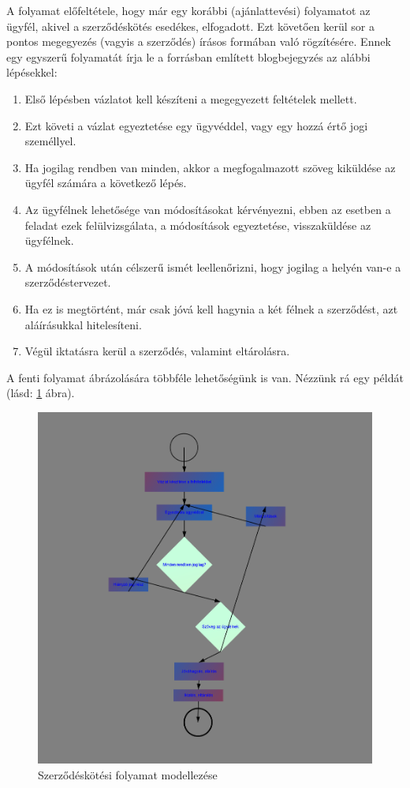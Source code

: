 A folyamat előfeltétele, hogy már egy korábbi (ajánlattevési) folyamatot az ügyfél, akivel a szerződéskötés esedékes, elfogadott. Ezt követően kerül sor a pontos megegyezés (vagyis a szerződés) írásos formában való rögzítésére. Ennek egy egyszerű folyamatát írja le a forrásban említett blogbejegyzés az alábbi lépésekkel:

\begin{enumerate}
\item Első lépésben vázlatot kell készíteni a megegyezett feltételek mellett.
\item Ezt követi a vázlat egyeztetése egy ügyvéddel, vagy egy hozzá értő jogi személlyel.
\item Ha jogilag rendben van minden, akkor a megfogalmazott szöveg kiküldése az ügyfél számára a következő lépés.
\item Az ügyfélnek lehetősége van módosításokat kérvényezni, ebben az esetben a feladat ezek felülvizsgálata, a módosítások egyeztetése, visszaküldése az ügyfélnek.
\item A módosítások után célszerű ismét leellenőrizni, hogy jogilag a helyén van-e a szerződéstervezet.
\item Ha ez is megtörtént, már csak jóvá kell hagynia a két félnek a szerződést, azt aláírásukkal hitelesíteni.
\item Végül iktatásra kerül a szerződés, valamint eltárolásra.
\end{enumerate}
A fenti folyamat ábrázolására többféle lehetőségünk is van. Nézzünk rá egy példát (lásd: \ref{fig:bpmn2} ábra).

\begin{figure}[h]
\centering
\includegraphics[scale=0.5]{images/pelda2.png}
\caption{Szerződéskötési folyamat modellezése}
\label{fig:bpmn2}
\end{figure}

